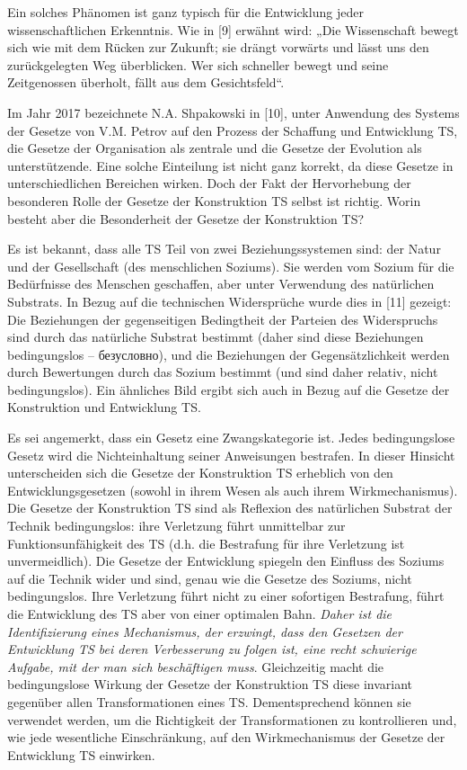 \documentclass[11pt,a4paper]{article}
\begin{document}
\begin{emph}
  Ein solches Phänomen ist ganz typisch für die Entwicklung jeder
  wissenschaftlichen Erkenntnis. Wie in [9] erwähnt wird: „Die Wissenschaft
  bewegt sich wie mit dem Rücken zur Zukunft; sie drängt vorwärts und lässt
  uns den zurückgelegten Weg überblicken. Wer sich schneller bewegt und seine
  Zeitgenossen überholt, fällt aus dem Gesichtsfeld“.
\end{emph}

Im Jahr 2017 bezeichnete N.A. Shpakowski in [10], unter Anwendung des Systems
der Gesetze von V.M. Petrov auf den Prozess der Schaffung und Entwicklung TS,
die Gesetze der Organisation als zentrale und die Gesetze der Evolution als
unterstützende. Eine solche Einteilung ist nicht ganz korrekt, da diese
Gesetze in unterschiedlichen Bereichen wirken. Doch der Fakt der Hervorhebung
der besonderen Rolle der Gesetze der Konstruktion TS selbst ist richtig. Worin
besteht aber die Besonderheit der Gesetze der Konstruktion TS?

Es ist bekannt, dass alle TS Teil von zwei Beziehungssystemen sind: der Natur
und der Gesellschaft (des menschlichen Soziums).  Sie werden vom Sozium für
die Bedürfnisse des Menschen geschaffen, aber unter Verwendung des natürlichen
Substrats.  In Bezug auf die technischen Widersprüche wurde dies in [11]
gezeigt: Die Beziehungen der gegenseitigen Bedingtheit der Parteien des
Widerspruchs sind durch das natürliche Substrat bestimmt (daher sind diese
Beziehungen bedingungslos -- \foreignlanguage{russian}{безусловно}), und die
Beziehungen der Gegensätzlichkeit werden durch Bewertungen durch das Sozium
bestimmt (und sind daher relativ, nicht bedingungslos). Ein ähnliches Bild
ergibt sich auch in Bezug auf die Gesetze der Konstruktion und Entwicklung TS.

Es sei angemerkt, dass ein Gesetz eine Zwangskategorie ist. Jedes
bedingungslose Gesetz wird die Nichteinhaltung seiner Anweisungen bestrafen.
In dieser Hinsicht unterscheiden sich die Gesetze der Konstruktion TS
erheblich von den Entwicklungsgesetzen (sowohl in ihrem Wesen als auch ihrem
Wirkmechanismus). Die Gesetze der Konstruktion TS sind als Reflexion des
natürlichen Substrat der Technik bedingungslos: ihre Verletzung führt
unmittelbar zur Funktionsunfähigkeit des TS (d.h. die Bestrafung für ihre
Verletzung ist unvermeidlich). Die Gesetze der Entwicklung spiegeln den
Einfluss des Soziums auf die Technik wider und sind, genau wie die Gesetze des
Soziums, nicht bedingungslos. Ihre Verletzung führt nicht zu einer sofortigen
Bestrafung, führt die Entwicklung des TS aber von einer optimalen Bahn.
\emph{Daher ist die Identifizierung eines Mechanismus, der erzwingt, dass den
  Gesetzen der Entwicklung TS bei deren Verbesserung zu folgen ist, eine recht
  schwierige Aufgabe, mit der man sich beschäftigen muss}. Gleichzeitig macht
die bedingungslose Wirkung der Gesetze der Konstruktion TS diese invariant
gegenüber allen Transformationen eines TS.  Dementsprechend können sie
verwendet werden, um die Richtigkeit der Transformationen zu kontrollieren
und, wie jede wesentliche Einschränkung, auf den Wirkmechanismus der Gesetze
der Entwicklung TS einwirken.
\end{document}

